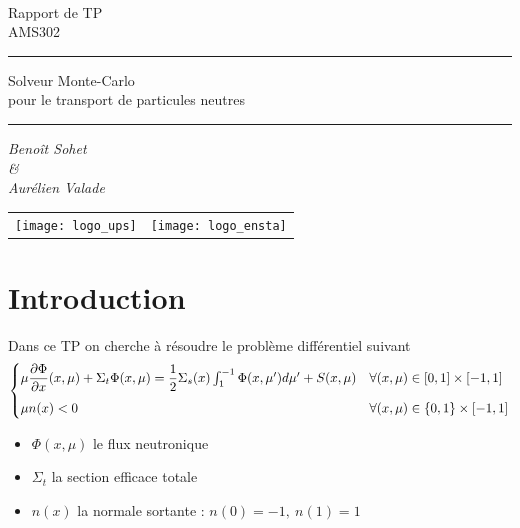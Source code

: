 \documentclass[11pt,a4paper]{article}
\newcommand{\dx}[1]{\dfrac{\partial #1}{\partial x}}
\begin{document}
\begin{titlepage}
  ~\vspace{90pt}
  \centering \bfseries

  \huge Rapport de TP \\AMS302

  \vspace{50pt}
  \rule{0.5\textwidth}{1pt}
  \vspace{50pt}

  \Huge Solveur Monte-Carlo \\ pour le transport de particules neutres

  \vspace{50pt}
  \rule{0.5\textwidth}{1pt}

  \vspace{50pt}
  \huge {\itshape Benoît Sohet \\ \& \\ Aurélien Valade}

  \vfill
  \begin{tabular}{cc}
    \begin{minipage}{.49\textwidth}
      \centering
      \texttt{[image: logo\_ups]}
    \end{minipage}
    &
      \begin{minipage}{.49\textwidth}
        \centering
        \texttt{[image: logo\_ensta]}
      \end{minipage}
  \end{tabular}

\end{titlepage}

\newpage

\section{Introduction}

Dans ce TP on cherche à résoudre le problème différentiel suivant 
\begin{equation}
  \label{eq:principal}
  \begin{cases}
    \mu \dx{\Phi}(x, \mu) + \Sigma_t \Phi(x, \mu) =
    \dfrac{1}{2} \Sigma_s(x) \int_1^{-1} \Phi(x, \mu') d\mu' + S(x, \mu) & \forall (x, \mu) \in [0,1]\times[-1,1]  \medskip\\ 
    \mu n(x) < 0  & \forall (x, \mu) \in \{0,1\}\times[-1,1] 
  \end{cases}
\end{equation}

\begin{itemize}
\item $\Phi(x, \mu)$ le flux neutronique
\item $\Sigma_t$ la section efficace totale 
\item $n(x)$ la normale sortante : $n(0) = -1, ~ n(1) = 1$
\end{itemize}
\end{document}
